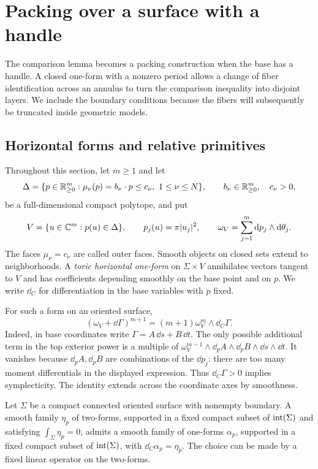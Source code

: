 \section{Packing over a surface with a handle}\label{surf:section}

The comparison lemma becomes a packing construction when the base has a
handle.  A closed one-form with a nonzero period allows a change of fiber
identification across an annulus to turn the comparison inequality into
disjoint layers.  We include the boundary conditions because the fibers
will subsequently be truncated inside geometric models.

\subsection{Horizontal forms and relative primitives}

Throughout this section, let $m\geq1$ and let
\[
 \Delta=\{p\in\mathbb R_{\geq0}^{m}:\mu_\nu(p)=b_\nu\cdot p\leq c_\nu,\
                         1\leq\nu\leq N\},
 \qquad b_\nu\in\mathbb R_{\geq0}^{m},\quad c_\nu>0,
\]
be a full-dimensional compact polytope, and put
\[
 V=\{u\in\mathbb C^m:p(u)\in\Delta\},\qquad
 p_j(u)=\pi|u_j|^2,\qquad
 \omega_V=\sum_{j=1}^m\mathrm d p_j\wedge\mathrm d\theta_j.
\]
The faces $\mu_\nu=c_\nu$ are called outer faces.  Smooth objects on
closed sets extend to neighborhoods.  A \emph{toric horizontal one-form}
on $\Sigma\times V$ annihilates vectors tangent to $V$ and has coefficients
depending smoothly on the base point and on $p$.  We write $\dd_C$ for
differentiation in the base variables with $p$ fixed.

For such a form on an oriented surface,
\begin{equation}\label{surf:toric-volume}
 (\omega_V+\dd\Gamma)^{m+1}
  =(m+1)\omega_V^m\wedge\dd_C\Gamma.
\end{equation}
Indeed, in base coordinates write $\Gamma=A\,\dd s+B\,\dd t$.
The only possible additional term in the top exterior power is a
multiple of
$\omega_V^{m-1}\wedge\dd_pA\wedge\dd_pB\wedge\dd s\wedge\dd t$.
It vanishes because $\dd_pA,\dd_pB$ are combinations of the $\dd p_j$:
there are too many moment differentials in the displayed expression.
Thus $\dd_C\Gamma>0$ implies symplecticity.  The identity extends across
the coordinate axes by smoothness.

\begin{lemma}\label{surf:primitive}
Let $\Sigma$ be a compact connected oriented surface with nonempty
boundary.  A smooth family $\eta_p$ of two-forms, supported in a fixed
compact subset of $\operatorname{int}(\Sigma)$ and satisfying
$\int_\Sigma\eta_p=0$, admits a smooth family of one-forms $\alpha_p$,
supported in a fixed compact subset of $\operatorname{int}(\Sigma)$, with
$\dd_C\alpha_p=\eta_p$.  The choice can be made by a fixed linear
operator on the two-forms.
\end{lemma}

